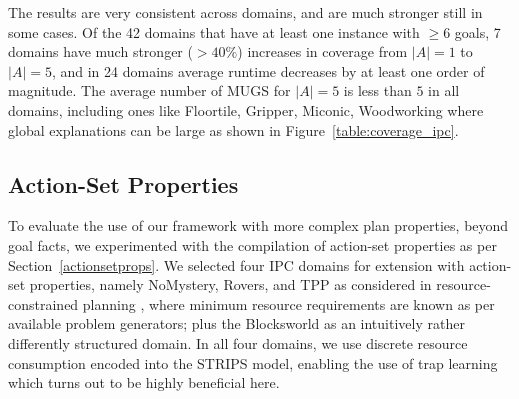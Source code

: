 %
%

The results are very consistent across domains, and are much stronger
still in some cases. Of the 42 domains that have at least one instance
with $\geq 6$ goals, 7 domains have much stronger ($> 40\%$) increases
in coverage from $|A|=1$ to $|A|=5$,
%
%
and in 24 domains average runtime decreases by at least one order of
magnitude. 
%
%
The average number of MUGS for $|A|=5$ is less than $5$ in all
domains, including ones like Floortile, Gripper, Miconic, Woodworking
where global explanations can be large as shown in
Figure~\ref{table:coverage_ipc}.














\ifdefined\suppflagdefined

\else

\subsection{Action-Set Properties}

To evaluate the use of our framework with more complex plan
properties, beyond goal facts, we experimented with the compilation of
action-set properties as per Section~\ref{actionsetprops}. We selected
four IPC domains for extension with action-set properties, namely
NoMystery, Rovers, and TPP as considered in resource-constrained
planning \cite{nakhost:etal:icaps-12}, where minimum resource
requirements are known as per available problem generators; plus the
Blocksworld as an intuitively rather differently structured domain. In
all four domains, we use discrete resource consumption encoded into
the STRIPS model, enabling the use of trap
learning \cite{steinmetz:hoffmann:ijcai-17} which turns out to be
highly beneficial here.

